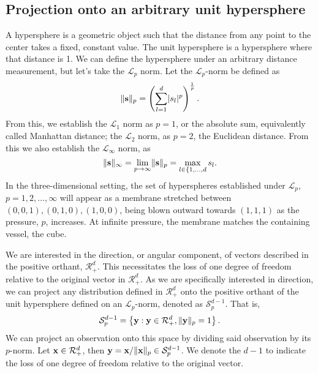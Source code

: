 \subsection{Projection onto an arbitrary unit hypersphere}
A hypersphere is a geometric object such that the distance from any point to the center takes a fixed,
  constant value.  The unit hypersphere is a hypersphere where that distance is 1. We can define the
  hypersphere under an arbitrary distance measurement, but let's take the $\mathcal{L}_p$ norm. Let
  the $\mathcal{L}_p$-norm be defined as
  \begin{equation*}
    \lVert {\bf s} \rVert_p = \left(\sum_{l = 1}^d \lvert s_l\rvert^p\right)^{\frac{1}{p}}.
  \end{equation*}
  From this, we establish the $\mathcal{L}_1$ norm as $p = 1$, or the absolute sum, equivalently called
  Manhattan distance; the $\mathcal{L}_2$ norm, as $p = 2$, the Euclidean distance.  From this we
  also establish the $\mathcal{L}_{\infty}$ norm, as
  \begin{equation*}
    \lVert {\bf s} \rVert_{\infty} = \lim\limits_{p\to\infty} \lVert {\bf s} \rVert_p = \max_{l\in\lbrace{1,\ldots,d}}s_l.
  \end{equation*}
  In the three-dimensional setting, the set of hyperspheres established under $\mathcal{L}_p$,
  $p = 1,2,\ldots,\infty$ will appear as a membrane stretched between $(0,0,1), (0,1,0), (1,0,0)$,
  being blown outward towards $(1,1,1)$ as the pressure, $p$, increases.  At infinite pressure, the
  membrane matches the containing vessel, the cube. 

We are interested in the direction, or angular component, of vectors described in the positive
  orthant, $\mathcal{R}_{+}^d$.  This necessitates the loss of one degree of freedom relative to the
  original vector in $\mathcal{R}_{+}^d$. As we are specifically interested in direction, we can
  project any distribution defined in $\mathcal{R}_{+}^d$ onto the positive orthant of the unit
  hypersphere defined on an $\mathcal{L}_p$-norm, denoted as $\mathcal{S}_{p}^{d-1}$.  That is,
  \begin{equation*}
    \mathcal{S}_{p}^{d-1} = \left\lbrace {\bf y} : {\bf y} \in \mathcal{R}_{+}^{d}, \lVert {\bf y}\rVert_{p} = 1\right\rbrace.
  \end{equation*}
  We can project an observation onto this space by dividing said observation by its $p$-norm. Let
  ${\bf x}\in \mathcal{R}_{+}^{d}$, then ${\bf y} = {\bf x} / \lVert {\bf x}\rVert_p \in \mathcal{S}_{p}^{d-1}$.
  We denote the $d-1$ to indicate the loss of one degree of freedom relative to the original vector.

